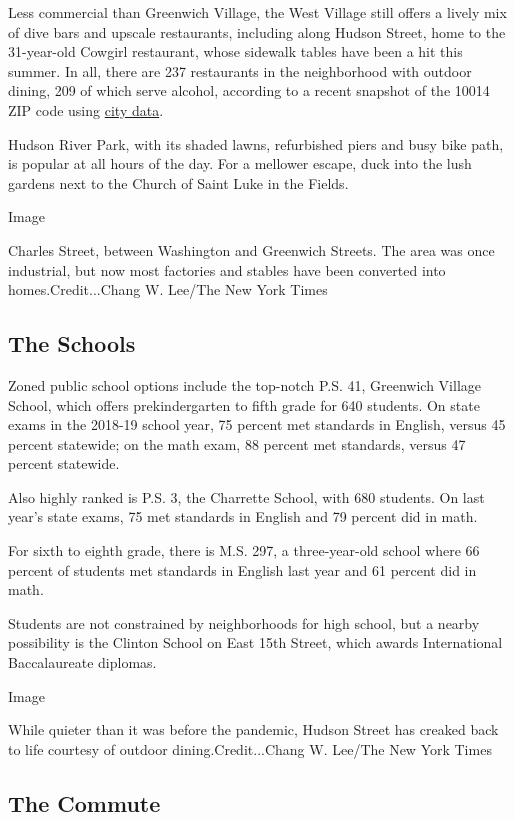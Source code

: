 Less commercial than Greenwich Village, the West Village still offers a
lively mix of dive bars and upscale restaurants, including along Hudson
Street, home to the 31-year-old Cowgirl restaurant, whose sidewalk
tables have been a hit this summer. In all, there are 237 restaurants in
the neighborhood with outdoor dining, 209 of which serve alcohol,
according to a recent snapshot of the 10014 ZIP code using
\href{https://experience.arcgis.com/experience/ba953db7d541423a8e67ae1cf52bc698}{city
data}.

Hudson River Park, with its shaded lawns, refurbished piers and busy
bike path, is popular at all hours of the day. For a mellower escape,
duck into the lush gardens next to the Church of Saint Luke in the
Fields.

Image

Charles Street, between Washington and Greenwich Streets. The area was
once industrial, but now most factories and stables have been converted
into homes.Credit...Chang W. Lee/The New York Times

\hypertarget{the-schools}{%
\subsection{The Schools}\label{the-schools}}

Zoned public school options include the top-notch P.S. 41, Greenwich
Village School, which offers prekindergarten to fifth grade for 640
students. On state exams in the 2018-19 school year, 75 percent met
standards in English, versus 45 percent statewide; on the math exam, 88
percent met standards, versus 47 percent statewide.

Also highly ranked is P.S. 3, the Charrette School, with 680 students.
On last year's state exams, 75 met standards in English and 79 percent
did in math.

For sixth to eighth grade, there is M.S. 297, a three-year-old school
where 66 percent of students met standards in English last year and 61
percent did in math.

Students are not constrained by neighborhoods for high school, but a
nearby possibility is the Clinton School on East 15th Street, which
awards International Baccalaureate diplomas.

Image

While quieter than it was before the pandemic, Hudson Street has creaked
back to life courtesy of outdoor dining.Credit...Chang W. Lee/The New
York Times

\hypertarget{the-commute}{%
\subsection{The Commute}\label{the-commute}}

